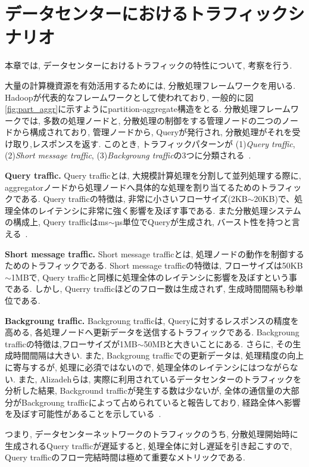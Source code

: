 \documentclass[technicalreport]{ieicej}
\begin{document}
\section{データセンターにおけるトラフィックシナリオ}
\label{sec:traffic_scenario}
本章では, データセンターにおけるトラフィックの特性について, 考察を行う.

大量の計算機資源を有効活用するためには, 分散処理フレームワークを用いる.
Hadoopが代表的なフレームワークとして使われており,
一般的に図\ref{fig:part_aggr}に示すようにpartition-aggregate構造をとる.
分散処理フレームワークでは, 多数の処理ノードと, 分散処理の制御をする管理ノードの二つのノードから構成されており, 管理ノードから, Queryが発行され, 分散処理がそれを受け取り,レスポンスを返す.
このとき, トラフィックパターンが  (1){\it Query traffic}, (2){\it Short message
traffic}, (3){\it Backgroung traffic}の3つに分類される~\cite{dctcp}.

{\bf Query traffic. }Query trafficとは, 大規模計算処理を分割して並列処理する際に,
aggregatorノードから処理ノードへ具体的な処理を割り当てるためのトラフィックである.
Query trafficの特徴は, 非常に小さいフローサイズ(2KB$\sim$20KB)で、処理全体のレイテンシに非常に強く影響を及ぼす事である.
また分散処理システムの構成上, Query trafficはms$\sim$µs単位でQueryが生成され,
バースト性を持つと言える~\cite{dctcp}.

{\bf Short message traffic. } Short message trafficとは,
処理ノードの動作を制御するためのトラフィックである.
Short message trafficの特徴は, フローサイズは50KB$\sim$1MBで, Query
trafficと同様に処理全体のレイテンシに影響を及ぼすという事である.
しかし, Querry trafficほどのフロー数は生成されず, 生成時間間隔も秒単位である.

{\bf Backgroung traffic. }Backgroung trafficは, Queryに対するレスポンスの精度を高める,
各処理ノードへ更新データを送信するトラフィックである.
Backgroung trafficの特徴は,フローサイズが1MB$\sim$50MBと大きいことにある.
さらに, その生成時間間隔は大きい.
また, Backgroung trafficでの更新データは, 処理精度の向上に寄与するが, 処理に必須ではないので,
処理全体のレイテンシにはつながらない.
また, Alizadehらは, 実際に利用されているデータセンターのトラフィックを分析した結果, Background trafficが発生する数は少ないが,
全体の通信量の大部分がBackgroung trafficによって占められていると報告しており,
経路全体へ影響を及ぼす可能性があることを示している~\cite{traffic}.

つまり, データセンターネットワークのトラフィックのうち, 分散処理開始時に生成されるQuery trafficが遅延すると,
処理全体に対し遅延を引き起こすので, Query trafficのフロー完結時間は極めて重要なメトリックである.
\end{document}
